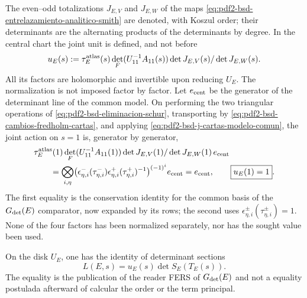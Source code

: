 The even--odd totalizations $J_{E,V}$ and $J_{E,W}$ of the maps
\eqref{eq:pdf2-bsd-entrelazamiento-analitico-smith} are denoted, with
Koszul order; their determinants are
the alternating products of the determinants by degree. In the central chart
the joint unit is defined, and not before
\begin{equation}\label{eq:pdf2-bsd-u-e-construida}
 u_E(s):=\tau_E^{\rm atlas}(s)
 \det_F(U_{11}^{-1}A_{11}(s))
 \frac{\det J_{E,V}(s)}
      {\det J_{E,W}(s)}.
\end{equation}
All its factors are holomorphic and invertible upon reducing $U_E$. The
normalization is not imposed factor by factor. Let $\mathbf e_{\rm cent}$ be the
generator of the determinant line of the common model. On performing the two
triangular operations of \eqref{eq:pdf2-bsd-eliminacion-schur}, transporting
by \eqref{eq:pdf2-bsd-cambios-fredholm-cartas}, and applying
\eqref{eq:pdf2-bsd-j-cartas-modelo-comun}, the joint action on $s=1$ is,
generator by generator,
\begin{equation}\label{eq:pdf2-bsd-u-e-normalizacion-probada}
 \begin{aligned}
 &\tau_E^{\rm atlas}(1)
 \det_F(U_{11}^{-1}A_{11}(1))
 \frac{\det J_{E,V}(1)}
      {\det J_{E,W}(1)}\,\mathbf e_{\rm cent}\\
 &\qquad=
 \bigotimes_{i,\eta}
 \bigl(\epsilon_{\eta,i}^-(\tau_{\eta,i}^-)
       \epsilon_{\eta,i}^+(\tau_{\eta,i}^+)^{-1}\bigr)^{(-1)^i}
 \mathbf e_{\rm cent}
 =\mathbf e_{\rm cent},
 \qquad \boxed{u_E(1)=1}.
 \end{aligned}
\end{equation}
The first equality is the conservation identity for the common basis of the
$\mathfrak G_{\rm det}(E)$ comparator, now expanded by its rows; the
second uses
$\epsilon_{\eta,i}^\pm(\tau_{\eta,i}^\pm)=1$. None of the four factors has been
normalized separately, nor has the sought value been used.

\begin{proposition}
\label{prop:pdf2-bsd-fers-factorizacion-owner}
On the disk $U_E$, one has the identity of determinant sections
\begin{equation}\label{eq:pdf2-bsd-factorizacion-analitica}
 \boxed{L(E,s)=u_E(s)\det S_E(T_E(s)).}
\end{equation}
The equality is the publication of the reader FERS of
$\mathfrak G_{\rm det}(E)$ and not a equality postulada afterward of
calcular the order or the term principal.
\end{proposition}

